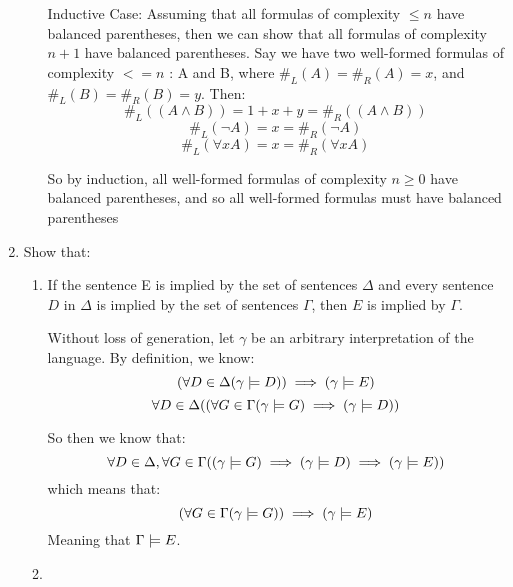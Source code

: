 \begin{enumerate}
\begin{enumerate}
        Inductive Case: Assuming that all formulas of complexity $\leq n$ have balanced parentheses, then we can show that all formulas of complexity $n+1$ have balanced parentheses. Say we have two well-formed formulas of complexity $<= n$ : A and B, where $\#_L(A) = \#_R(A) = x$, and $\#_L(B) = \#_R(B) = y$. Then:
        $$\#_L((A \land B)) = 1 + x + y = \#_R((A \land B))$$
        $$\#_L(\neg A) = x = \#_R(\neg A)$$
        $$\#_L(\forall x A) = x = \#_R(\forall x A)$$

        So by induction, all well-formed formulas of complexity $n \geq 0$ have balanced parentheses, and so all well-formed formulas must have balanced parentheses

    \end{enumerate}


  \item 
    \begin{question}
      Show that:
    \end{question}

    \begin{enumerate}
      \item
        \begin{question}
          If the sentence E is implied by the set of sentences $\Delta$ and every sentence $D$ in $\Delta$ is implied by the set of sentences $\Gamma$, then $E$ is implied by $\Gamma$.
        \end{question}

        Without loss of generation, let $\gamma$ be an arbitrary interpretation of the language. By definition, we know:
        $$(\forall D \in \Delta (\gamma \mathrel{|}\!= D)) \implies (\gamma \mathrel{|}\!= E)$$
        $$\forall D \in \Delta ((\forall G \in \Gamma (\gamma \mathrel{|}\!= G) \implies (\gamma \mathrel{|}\!= D))$$

        So then we know that:
        $$\forall D \in \Delta, \forall G \in \Gamma ((\gamma \mathrel{|}\!= G) \implies (\gamma \mathrel{|}\!= D) \implies (\gamma \mathrel{|}\!= E))$$
        which means that:
        $$(\forall G \in \Gamma (\gamma \mathrel{|}\!= G)) \implies (\gamma \mathrel{|}\!= E)$$
        Meaning that $\Gamma \mathrel{|}\!= E$.\\
        

      \item 



\end{enumerate}
\end{enumerate}
